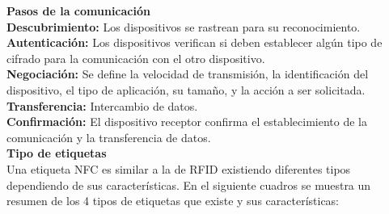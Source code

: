 \documentclass[11pt,openany]{book}
\newcounter{ns}
\begin{document}
	\textbf{Pasos de la comunicación}\\[0.25cm]
	\textbf{Descubrimiento: }Los dispositivos se rastrean para su reconocimiento.\\
	\textbf{Autenticación: }Los dispositivos verifican si deben establecer algún tipo de cifrado para la comunicación con el otro dispositivo.\\
	\textbf{Negociación: }Se define la velocidad de transmisión, la identificación del dispositivo, el tipo de aplicación, su tamaño, y la acción a ser solicitada.\\
	\textbf{Transferencia: }Intercambio de datos.\\
	\textbf{Confirmación: }El dispositivo receptor confirma el establecimiento de la comunicación y la transferencia de datos.\\

	\textbf{Tipo de etiquetas}\\[0.25cm]
	Una etiqueta NFC es similar a la de RFID existiendo diferentes tipos dependiendo de sus características. En el siguiente cuadros se muestra un resumen de los 4 tipos de etiquetas que existe y sus características:
\end{document}
